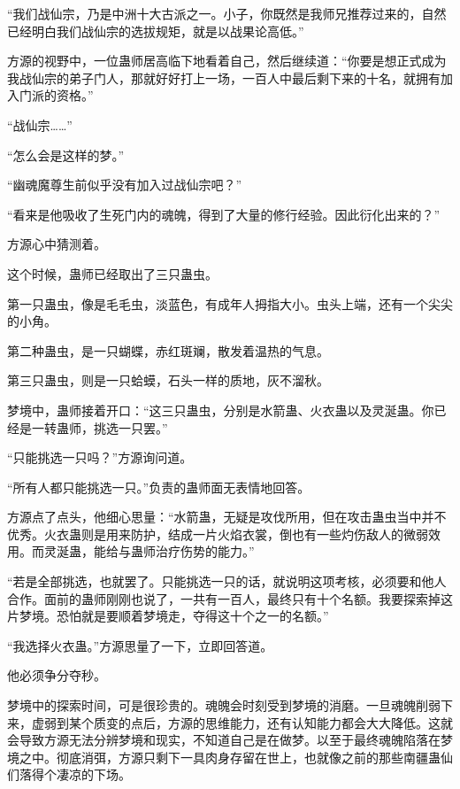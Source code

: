 
\begin{this_body}

“我们战仙宗，乃是中洲十大古派之一。小子，你既然是我师兄推荐过来的，自然已经明白我们战仙宗的选拔规矩，就是以战果论高低。”

方源的视野中，一位蛊师居高临下地看着自己，然后继续道：“你要是想正式成为我战仙宗的弟子门人，那就好好打上一场，一百人中最后剩下来的十名，就拥有加入门派的资格。”

“战仙宗……”

“怎么会是这样的梦。”

“幽魂魔尊生前似乎没有加入过战仙宗吧？”

“看来是他吸收了生死门内的魂魄，得到了大量的修行经验。因此衍化出来的？”

方源心中猜测着。

这个时候，蛊师已经取出了三只蛊虫。

第一只蛊虫，像是毛毛虫，淡蓝色，有成年人拇指大小。虫头上端，还有一个尖尖的小角。

第二种蛊虫，是一只蝴蝶，赤红斑斓，散发着温热的气息。

第三只蛊虫，则是一只蛤蟆，石头一样的质地，灰不溜秋。

梦境中，蛊师接着开口：“这三只蛊虫，分别是水箭蛊、火衣蛊以及灵涎蛊。你已经是一转蛊师，挑选一只罢。”

“只能挑选一只吗？”方源询问道。

“所有人都只能挑选一只。”负责的蛊师面无表情地回答。

方源点了点头，他细心思量：“水箭蛊，无疑是攻伐所用，但在攻击蛊虫当中并不优秀。火衣蛊则是用来防护，结成一片火焰衣裳，倒也有一些灼伤敌人的微弱效用。而灵涎蛊，能给与蛊师治疗伤势的能力。”

“若是全部挑选，也就罢了。只能挑选一只的话，就说明这项考核，必须要和他人合作。面前的蛊师刚刚也说了，一共有一百人，最终只有十个名额。我要探索掉这片梦境。恐怕就是要顺着梦境走，夺得这十个之一的名额。”

“我选择火衣蛊。”方源思量了一下，立即回答道。

他必须争分夺秒。

梦境中的探索时间，可是很珍贵的。魂魄会时刻受到梦境的消磨。一旦魂魄削弱下来，虚弱到某个质变的点后，方源的思维能力，还有认知能力都会大大降低。这就会导致方源无法分辨梦境和现实，不知道自己是在做梦。以至于最终魂魄陷落在梦境之中。彻底消弭，方源只剩下一具肉身存留在世上，也就像之前的那些南疆蛊仙们落得个凄凉的下场。


\end{this_body}
